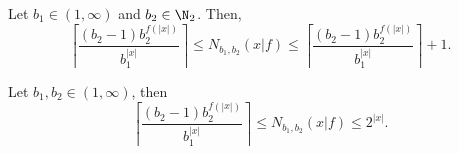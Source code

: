 % 

\begin{theorem}
    Let $b_1 \in (1,\infty)$ and $b_2 \in \N_2$. Then,
    \begin{equation}
       \left\lceil\frac{(b_2-1)b_2^{f(|x|)}}{b_1^{{|x|}}}\right\rceil \leq N_{b_1,b_2}(x|f) \leq \left\lceil\frac{(b_2-1)b_2^{f(|x|)}}{b_1^{{|x|}}}\right\rceil +1.
    \end{equation}
\end{theorem}

\begin{theorem}
    Let $b_1,b_2 \in (1,\infty)$, then 
    \begin{equation}
        \left\lceil\frac{(b_2-1)b_2^{f(|x|)}}{b_1^{{|x|}}}\right\rceil \leq N_{b_1,b_2}(x|f) \leq 2^{|x|}.
     \end{equation}
\end{theorem}

